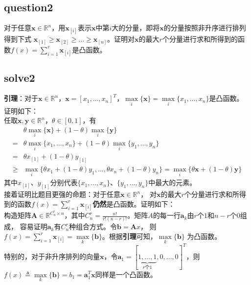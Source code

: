 \documentclass[12pt,a4paper]{ctexart}
\begin{document}
\subsection*{question2}
对于任意$\boldsymbol{x} \in \mathbb{R}^n$，用$\boldsymbol{x}_{[i]}$表示$\boldsymbol{x}$中第$i$大的分量，即将$\boldsymbol{x}$的分量按照非升序进行排列得到下式
$\boldsymbol{x}_{[1]} \geq \boldsymbol{x}_{[2]} \geq \ldots \geq \boldsymbol{x}_{[n]}$。证明对$\boldsymbol{x}$的最大$r$个分量进行求和所得到的函数$f(x)=\sum_{i=1}^r \boldsymbol{x}_{[i]}$是凸函数。

\subsection*{solve2}
\textbf{引理}：对于$\boldsymbol{x} \in \mathbb{R}^n$，$\boldsymbol{x}=[x_1,\ldots,x_n]^T$，$\max\limits_{i}\{\boldsymbol{x}\}=\max\limits_{i}\{x_1,\ldots,x_n\}$是凸函数。
证明如下：\\
任取$\boldsymbol{x},\boldsymbol{y} \in \mathbb{R}^n$，$\theta \in [0,1]$，有
\begin{align*}
&\theta \max\limits_{i}\{\boldsymbol{x}\}+(1-\theta)\max\limits_{i}\{\boldsymbol{y}\}\\
=&\theta \max\limits_{i}\{x_1,\ldots,x_n\}+(1-\theta)\max\limits_{i}\{y_1,\ldots,y_n\}\\
=&\theta x_{[1]}+(1-\theta)y_{[1]}\\
\geq &\max\limits_{i}\{\theta x_1+(1-\theta)y_1,\ldots,\theta x_n+(1-\theta)y_n\}= \max\limits_{i}\{\theta \boldsymbol{x}+(1-\theta)\boldsymbol{y}\}
\end{align*}
其中$x_{[1]}$、$y_{[1]}$分别代表$\{x_1,\ldots,x_n\}$、$\{y_1,\ldots,y_n\}$中最大的元素。\\
接着证明比题目更强的命题：对于任意$\boldsymbol{x} \in \mathbb{R}^n$，
对$\boldsymbol{x}$的最大$r$个分量进行求和所得到的函数$f(x)=\sum\limits_{i=1}^r \boldsymbol{x}_{[i]}$\textbf{仍然}是凸函数。证明如下：\\
构造矩阵$\boldsymbol{A} \in \mathbb{R}^{C_{n}^r \times n}$，其中$C_{n}^r=\frac{n!}{r!(n-r)!}$。矩阵$A$的每一行$\boldsymbol{a}_k$由$r$个$1$和$n-r$个$0$组成，
容易证明$\boldsymbol{a}_k$有$C_{n}^r$种组合方式。令$\boldsymbol{b}=\boldsymbol{A}x$，
则$f(x)=\sum\limits_{i=1}^r \boldsymbol{x}_{[i]}=\max\limits_{k}\{\boldsymbol{b}\}$。根据\textbf{引理}可知，$\max\limits_{k}\{\boldsymbol{b}\}$
为凸函数。\\
特别的，对于非升序排列的向量$\boldsymbol{x}$，令$\boldsymbol{a}_1=[\underbrace{1,\ldots,1}_{r\text{个}1},0,\ldots,0]^T$，则
$f(x)\triangleq \max\limits_{k}\{\boldsymbol{b}\}=b_1=\boldsymbol{a}_1^T \boldsymbol{x}$同样是一个凸函数。
\end{document}
